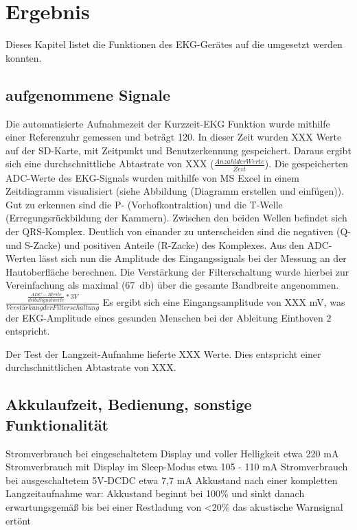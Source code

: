 
\section{Ergebnis}

Dieses Kapitel listet die Funktionen des EKG-Gerätes auf die umgesetzt werden konnten. 

\subsection{aufgenommene Signale}

Die automatisierte Aufnahmezeit der Kurzzeit-EKG Funktion wurde mithilfe einer Referenzuhr gemessen und beträgt \SI{120}{\sec}. In dieser Zeit wurden XXX Werte auf der SD-Karte, mit Zeitpunkt und Benutzerkennung gespeichert. Daraus ergibt sich eine durchschnittliche Abtastrate von XXX ($ \frac{Anzahl der Werte}{Zeit}$). Die gespeicherten ADC-Werte des EKG-Signals wurden mithilfe von MS Excel in einem Zeitdiagramm visualisiert (siehe Abbildung (Diagramm erstellen und einfügen)). Gut zu erkennen sind die P- (Vorhofkontraktion) und die T-Welle (Erregungsrückbildung der Kammern). Zwischen den beiden Wellen befindet sich der QRS-Komplex. Deutlich von einander zu unterscheiden sind die negativen (Q- und S-Zacke) und positiven Anteile (R-Zacke) des Komplexes. Aus den ADC-Werten lässt sich nun die Amplitude des Eingangssignals bei der Messung an der Hautoberfläche berechnen. Die Verstärkung der Filterschaltung wurde hierbei zur Vereinfachung als maximal (\SI{67}{\decibel}) über die gesamte Bandbreite angenommen. 
$  \frac{\frac{ADC-Breite}{delta Signalwerte} * 3V}{Verstärkung der Filterschaltung} $
Es ergibt sich eine Eingangsamplitude von XXX mV, was der EKG-Amplitude eines gesunden Menschen bei der Ableitung Einthoven 2 entspricht.

Der Test der Langzeit-Aufnahme lieferte XXX Werte. Dies entspricht einer durchschnittlichen Abtastrate von XXX.



\subsection{Akkulaufzeit, Bedienung, sonstige Funktionalität}

Stromverbrauch bei eingeschaltetem Display und voller Helligkeit etwa 220 mA
Stromverbrauch mit Display im Sleep-Modus etwa 105 - 110 mA
Stromverbrauch bei ausgeschaltetem 5V-DCDC etwa 7,7 mA
Akkustand nach einer kompletten Langzeitaufnahme war: 
Akkustand beginnt bei 100\% und sinkt danach erwartungsgemäß bis bei einer Restladung von <20\% das akustische Warnsignal ertönt